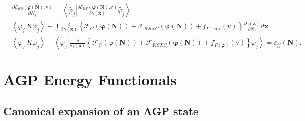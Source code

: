 \documentclass[aps,preprint]{revtex4}%
\begin{document}
\begin{align}
&  \frac{\partial\mathcal{E}_{KS}\left(  \mathbf{\varphi}\left(
\mathbf{N}\right)  ,\mathrm{v}\right)  }{\partial N_{j}}=\left\langle
\widetilde{\varphi_{j}}\left\vert \frac{\delta\mathcal{E}_{KS}\left(
\mathbf{\varphi}\left(  \mathbf{N}\right)  ,\mathrm{v}\right)  }{\delta
\gamma\left(  \mathbf{x}\right)  }\widetilde{\varphi_{j}}\right.
\right\rangle =\nonumber\\
&  \left\langle \widetilde{\varphi_{j}}\left\vert K\widetilde{\varphi_{j}%
}\right.  \right\rangle +\int\frac{\delta}{\delta\gamma\left(  \mathbf{x}%
\right)  }\left\{  \mathcal{F}_{C}\left(  \mathbf{\varphi}\left(
\mathbf{N}\right)  \right)  +\mathcal{F}_{KSXC}\left(  \mathbf{\varphi}\left(
\mathbf{N}\right)  \right)  +f_{\Gamma\left(  \mathbf{\varphi}\right)
}\left(  \mathrm{v}\right)  \right\}  \frac{\partial\gamma\left(
\mathbf{x}\right)  }{\partial N_{j}}d\mathbf{x=}\nonumber\\
&  \left\langle \widetilde{\varphi_{j}}\left\vert K\widetilde{\varphi_{j}%
}\right.  \right\rangle +\left\langle \widetilde{\varphi_{j}}\left\vert
\frac{\delta}{\delta\gamma\left(  \mathbf{x}\right)  }\left\{  \mathcal{F}%
_{C}\left(  \mathbf{\varphi}\left(  \mathbf{N}\right)  \right)  +\mathcal{F}%
_{KSXC}\left(  \mathbf{\varphi}\left(  \mathbf{N}\right)  \right)
+f_{\Gamma\left(  \mathbf{\varphi}\right)  }\left(  \mathrm{v}\right)
\right\}  \right.  \widetilde{\varphi_{j}}\right\rangle =\varepsilon
_{jj}\left(  \mathbf{N}\right)  .
\end{align}


\section{AGP Energy Functionals\label{AGP}}

\subsection{Canonical expansion of an AGP state}
\end{document}
